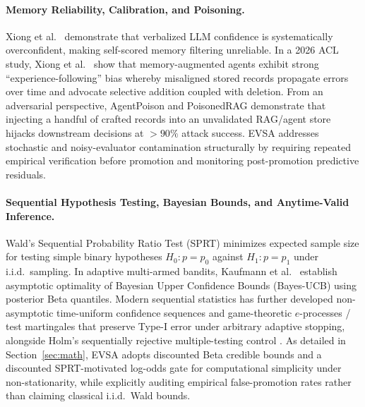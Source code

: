 \documentclass[10pt,letterpaper]{article}
\begin{document}
\paragraph{Memory Reliability, Calibration, and Poisoning.}
Xiong et al.\ \cite{xiong2024can} demonstrate that verbalized LLM confidence is systematically overconfident, making self-scored memory filtering unreliable. In a 2026 ACL study, Xiong et al.\ \cite{xiong2026memory} show that memory-augmented agents exhibit strong ``experience-following'' bias whereby misaligned stored records propagate errors over time and advocate selective addition coupled with deletion. From an adversarial perspective, AgentPoison \cite{chen2024agentpoison} and PoisonedRAG \cite{zou2025poisonedrag} demonstrate that injecting a handful of crafted records into an unvalidated RAG/agent store hijacks downstream decisions at $>90\%$ attack success. EVSA addresses stochastic and noisy-evaluator contamination structurally by requiring repeated empirical verification before promotion and monitoring post-promotion predictive residuals.

\paragraph{Sequential Hypothesis Testing, Bayesian Bounds, and Anytime-Valid Inference.}
Wald's Sequential Probability Ratio Test (SPRT) \cite{wald1945sequential} minimizes expected sample size for testing simple binary hypotheses $H_0: p = p_0$ against $H_1: p = p_1$ under i.i.d.\ sampling. In adaptive multi-armed bandits, Kaufmann et al.\ \cite{kaufmann2012bayesian} establish asymptotic optimality of Bayesian Upper Confidence Bounds (Bayes-UCB) using posterior Beta quantiles. Modern sequential statistics has further developed non-asymptotic time-uniform confidence sequences \cite{howard2021time} and game-theoretic $e$-processes / test martingales \cite{ramdas2023game} that preserve Type-I error under arbitrary adaptive stopping, alongside Holm's sequentially rejective multiple-testing control \cite{holm1979simple}. As detailed in Section~\ref{sec:math}, EVSA adopts discounted Beta credible bounds and a discounted SPRT-motivated log-odds gate for computational simplicity under non-stationarity, while explicitly auditing empirical false-promotion rates rather than claiming classical i.i.d.\ Wald bounds.
\end{document}
